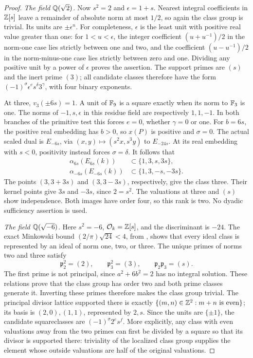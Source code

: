\begin{proof}
\emph{The field \(\mathbb Q(\sqrt2)\).}
Now \(s^2=2\) and \(\epsilon=1+s\).  Nearest integral
coefficients in \(\mathbb Z[s]\) leave a remainder of absolute norm
at most \(1/2\), so again the class group is trivial.  Its
units are \(\pm\epsilon^n\).  For completeness,
\(\epsilon\) is the least unit with positive real value greater
than one: for \(1<u<\epsilon\), the integer coefficient
\((u+u^{-1})/2\) in the norm-one case lies strictly between
one and two, and the coefficient \((u-u^{-1})/2\) in the
norm-minus-one case lies strictly between zero and one.
Dividing any positive unit by a power of \(\epsilon\) proves
the assertion.  The support primes are \((s)\) and the inert
prime \((3)\); all candidate classes therefore have the form
\((-1)^\sigma\epsilon^es^\delta3^\gamma\), with four binary
exponents.

At three, \(v_3(\pm6s)=1\).  A unit of \(\mathbb F_9\) is a
square exactly when its norm to \(\mathbb F_3\) is one.
The norms of \(-1,s,\epsilon\) in this residue field are
respectively \(1,1,-1\).  In both branches of the primitive
test this forces \(e=0\), whether \(\gamma=0\) or one.
For \(b=6s\), the positive real embedding has \(b>0\),
so \(x(P)\) is positive and \(\sigma=0\).  The actual
scaled dual is \(E_{-6s}\), via
\((x,y)\mapsto(s^2x,s^3y)\) to \(E_{-24s}\).
At its real embedding with \(s<0\), positivity instead
forces \(\sigma=\delta\).  It follows that
\[
\begin{aligned}
 \alpha_{6s}(E_{6s}(k))&\subset\{1,3,s,3s\},\\
 \alpha_{-6s}(E_{-6s}(k))&\subset\{1,3,-s,-3s\}.
\end{aligned}
\tag{A.185.14}
\]
The points \((3,3+3s)\) and \((3,3-3s)\), respectively,
give the class three.  Their kernel points give \(3s\) and
\(-3s\), since \(2=s^2\).  The valuations at three and
\((s)\) show independence.  Both images have order four,
so this rank is two.  No dyadic sufficiency assertion is used.

\emph{The field \(\mathbb Q(\sqrt{-6})\).}
Here \(s^2=-6\), \(\mathcal O_k=\mathbb Z[s]\), and the
discriminant is \(-24\).  The exact Minkowski bound
\((2/\pi)\sqrt{24}<4\), from
\cite[Theorem 4.3, p.70]{AgentMilneANT}, shows that every ideal
class is represented by an ideal of norm one, two, or three.
The unique primes of norms two and three satisfy
\[
 \mathfrak p_2^2=(2),\qquad \mathfrak p_3^2=(3),
 \qquad\mathfrak p_2\mathfrak p_3=(s).
\tag{A.185.15}
\]
The first prime is not principal, since \(a^2+6b^2=2\) has
no integral solution.  These relations prove that the class
group has order two and both prime classes generate it.
Inverting these primes therefore makes the class group trivial.
The principal divisor lattice supported there is exactly
\(\{(m,n)\in\mathbb Z^2:m+n\text{ is even}\}\); its basis is
\((2,0),(1,1)\), represented by \(2,s\).  Since the units
are \(\{\pm1\}\), the candidate squareclasses are
\((-1)^\sigma2^es^f\).  More explicitly, any class with
even valuations away from the two primes can first be divided
by a square so that its divisor is supported there: triviality
of the localized class group supplies the element whose
outside valuations are half of the original valuations.


\end{proof}
